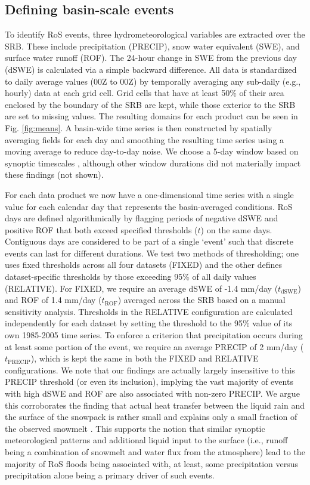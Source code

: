 \documentclass[nhess, manuscript]{copernicus}
\begin{document}
\subsection{Defining basin-scale events}

To identify RoS events, three hydrometeorological variables are extracted over the SRB.
These include precipitation (PRECIP), snow water equivalent (SWE), and surface water runoff (ROF).
The 24-hour change in SWE from the previous day (dSWE) is calculated via a simple backward difference.
All data is standardized to daily average values (00Z to 00Z) by temporally averaging any sub-daily (e.g., hourly) data at each grid cell.
Grid cells that have at least 50\% of their area enclosed by the boundary of the SRB are kept, while those exterior to the SRB are set to missing values.
The resulting domains for each product can be seen in Fig. \ref{fig:means}. A basin-wide time series is then constructed by spatially averaging fields for each day and smoothing the resulting time series using a moving average to reduce day-to-day noise.
We choose a 5-day window based on synoptic timescales \citep{holton2004introduction}, although other window durations did not materially impact these findings (not shown).

For each data product we now have a one-dimensional time series with a single value for each calendar day that represents the basin-averaged conditions.
RoS days are defined algorithmically by flagging periods of negative dSWE and positive ROF that both exceed specified thresholds ($t$) on the same days.
Contiguous days are considered to be part of a single `event' such that discrete events can last for different durations.
We test two methods of thresholding; one uses fixed thresholds across all four datasets (FIXED) and the other defines dataset-specific thresholds by those exceeding 95\% of all daily values (RELATIVE).
For FIXED, we require an average dSWE of -1.4 mm/day ($t_{\textrm{dSWE}}$) and ROF of 1.4 mm/day ($t_{\textrm{ROF}}$) averaged across the SRB based on a manual sensitivity analysis.
Thresholds in the RELATIVE configuration are calculated independently for each dataset by setting the threshold to the 95\% value of its own 1985-2005 time series.
To enforce a criterion that precipitation occurs during at least some portion of the event, we require an average PRECIP of 2 mm/day ($t_{\textrm{PRECIP}}$), which is kept the same in both the FIXED and RELATIVE configurations. We note that our findings are actually largely insensitive to this PRECIP threshold (or even its inclusion), implying the vast majority of events with high dSWE and ROF are also associated with non-zero PRECIP.  We argue this corroborates the finding that actual heat transfer between the liquid rain and the surface of the snowpack is rather small and explains only a small fraction of the observed snowmelt \citep{moore1984controls}. 
This supports the notion that similar synoptic meteorological patterns \citep{grote2021synoptic} and additional liquid input to the surface (i.e., runoff being a combination of snowmelt and water flux from the atmosphere) lead to the majority of RoS floods being associated with, at least, some precipitation versus precipitation alone being a primary driver of such events.
\end{document}

